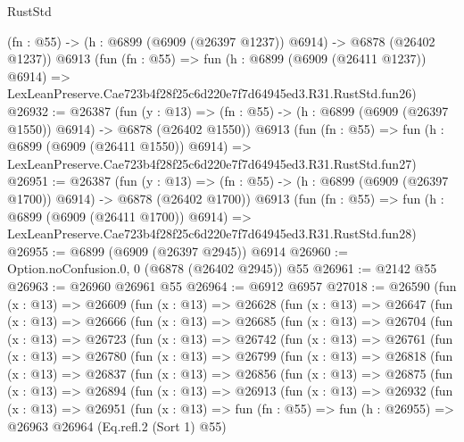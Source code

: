 \begin{lexlean}{RustStd}
\begin{coremodule}
    (fn : @55) -> (h : @6899 (@6909 (@26397 @1237)) @6914) -> @6878 (@26402 @1237))
    @6913
    (fun (fn : @55) =>
    fun (h : @6899 (@6909 (@26411 @1237)) @6914) =>
    LexLeanPreserve.Cae723b4f28f25c6d220e7f7d64945ed3.R31.RustStd.fun26)
@26932 := @26387
    (fun (y : @13) =>
    (fn : @55) -> (h : @6899 (@6909 (@26397 @1550)) @6914) -> @6878 (@26402 @1550))
    @6913
    (fun (fn : @55) =>
    fun (h : @6899 (@6909 (@26411 @1550)) @6914) =>
    LexLeanPreserve.Cae723b4f28f25c6d220e7f7d64945ed3.R31.RustStd.fun27)
@26951 := @26387
    (fun (y : @13) =>
    (fn : @55) -> (h : @6899 (@6909 (@26397 @1700)) @6914) -> @6878 (@26402 @1700))
    @6913
    (fun (fn : @55) =>
    fun (h : @6899 (@6909 (@26411 @1700)) @6914) =>
    LexLeanPreserve.Cae723b4f28f25c6d220e7f7d64945ed3.R31.RustStd.fun28)
@26955 := @6899 (@6909 (@26397 @2945)) @6914
@26960 := Option.noConfusion.{0, 0} (@6878 (@26402 @2945)) @55
@26961 := @2142 @55
@26963 := @26960 @26961 @55
@26964 := @6912 @6957
@27018 := @26590
    (fun (x : @13) =>
    @26609
      (fun (x : @13) =>
      @26628
        (fun (x : @13) =>
        @26647
          (fun (x : @13) =>
          @26666
            (fun (x : @13) =>
            @26685
              (fun (x : @13) =>
              @26704
                (fun (x : @13) =>
                @26723
                  (fun (x : @13) =>
                  @26742
                    (fun (x : @13) =>
                    @26761
                      (fun (x : @13) =>
                      @26780
                        (fun (x : @13) =>
                        @26799
                          (fun (x : @13) =>
                          @26818
                            (fun (x : @13) =>
                            @26837
                              (fun (x : @13) =>
                              @26856
                                (fun (x : @13) =>
                                @26875
                                  (fun (x : @13) =>
                                  @26894
                                    (fun (x : @13) =>
                                    @26913
                                      (fun (x : @13) =>
                                      @26932
                                        (fun (x : @13) =>
                                        @26951
                                          (fun (x : @13) =>
                                          fun (fn : @55) =>
                                          fun (h : @26955) =>
                                          @26963
                                            @26964
                                            (Eq.refl.{2} (Sort 1) @55)

\end{coremodule}
\end{lexlean}
